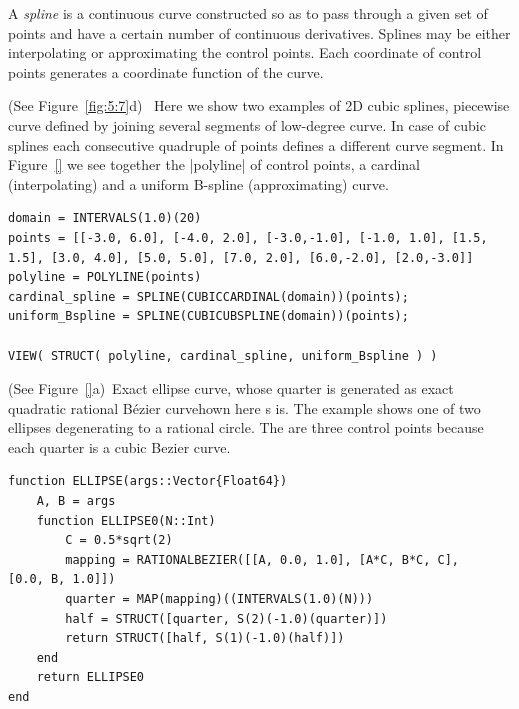 \begin{coding}[Algebraic computation of FE = $\delta_1$]
{\begin{definition}
A \emph{spline} is a continuous curve constructed so as to pass through a given set of points and have a certain number of continuous derivatives. Splines may be either interpolating or approximating the control points. Each coordinate of control points generates a coordinate function of the curve.
\end{definition}

\begin{condition} (See Figure~\ref{fig:5:7}d)\
\label{}
Here we show two examples of 2D cubic splines, piecewise curve defined by joining several segments of low-degree curve. In case of cubic splines each consecutive quadruple of points defines a different curve segment. In Figure~\ref{} we see together the |polyline|  of control points, a cardinal (interpolating) and a uniform B-spline (approximating) curve.
\begin{lstlisting}[language=JuliaLocal, style=julia, mathescape=true]
domain = INTERVALS(1.0)(20)
points = [[-3.0, 6.0], [-4.0, 2.0], [-3.0,-1.0], [-1.0, 1.0], [1.5, 1.5], [3.0, 4.0], [5.0, 5.0], [7.0, 2.0], [6.0,-2.0], [2.0,-3.0]]
polyline = POLYLINE(points) 
cardinal_spline = SPLINE(CUBICCARDINAL(domain))(points);
uniform_Bspline = SPLINE(CUBICUBSPLINE(domain))(points);

VIEW( STRUCT( polyline, cardinal_spline, uniform_Bspline ) )
\end{lstlisting}
\end{condition}


\begin{condition}[(Exact ellipse curve] (See Figure~\ref{}a)\
Exact ellipse curve, whose quarter is generated as exact quadratic rational Bézier curvehown here s is. The example shows one of two ellipses degenerating to a rational circle. The are three control points because each quarter is a cubic Bezier curve.
\begin{lstlisting}[language=JuliaLocal, style=julia, mathescape=true]
function ELLIPSE(args::Vector{Float64})
	A, B = args
	function ELLIPSE0(N::Int)
		C = 0.5*sqrt(2)
		mapping = RATIONALBEZIER([[A, 0.0, 1.0], [A*C, B*C, C], 		[0.0, B, 1.0]])
		quarter = MAP(mapping)((INTERVALS(1.0)(N)))
		half = STRUCT([quarter, S(2)(-1.0)(quarter)])
		return STRUCT([half, S(1)(-1.0)(half)])
	end
	return ELLIPSE0
end


\end{lstlisting}
\end{condition}}
\end{coding}
